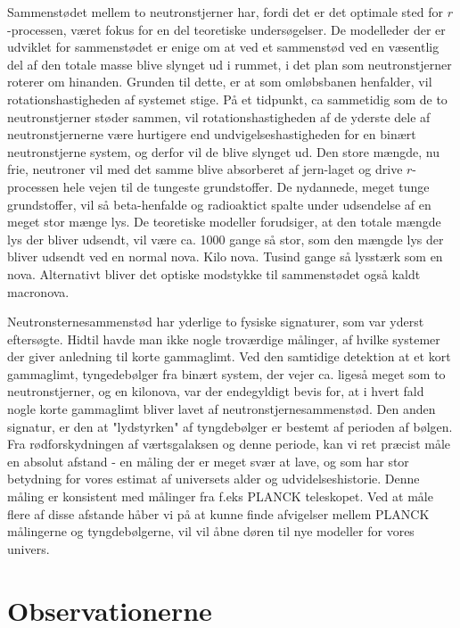 \documentclass[twocolumn]{article}
\begin{document}
Sammenstødet mellem to neutronstjerner har, fordi det er det optimale sted for $r$-processen, været fokus for en del teoretiske undersøgelser. De modelleder der er udviklet for sammenstødet er enige om at ved et sammenstød ved en væsentlig del af den totale masse blive slynget ud i rummet, i det plan som neutronstjerner roterer om hinanden. Grunden til dette, er at som omløbsbanen henfalder, vil rotationshastigheden af systemet stige. På et tidpunkt, ca sammetidig som de to neutronstjerner støder sammen, vil rotationshastigheden af de yderste dele af neutronstjernerne være hurtigere end undvigelseshastigheden for en binært neutronstjerne system, og derfor vil de blive slynget ud. Den store mængde, nu frie, neutroner vil med det samme blive absorberet af jern-laget og drive $r$-processen hele vejen til de tungeste grundstoffer. De nydannede, meget tunge grundstoffer, vil så beta-henfalde og radioaktict spalte under udsendelse af en meget stor mænge lys. De teoretiske modeller forudsiger, at den totale mængde lys der bliver udsendt, vil være ca. 1000 gange så stor, som den mængde lys der bliver udsendt ved en normal nova. Kilo nova. Tusind gange så lysstærk som en nova. Alternativt bliver det optiske modstykke til sammenstødet også kaldt macronova. 

Neutronsternesammenstød har yderlige to fysiske signaturer, som var yderst eftersøgte. Hidtil havde man ikke nogle troværdige målinger, af hvilke systemer der giver anledning til korte gammaglimt. Ved den samtidige detektion at et kort gammaglimt, tyngedebølger fra binært system, der vejer ca. ligeså meget som to neutronstjerner, og en kilonova, var der endegyldigt bevis for, at i hvert fald nogle korte gammaglimt bliver lavet af neutronstjernesammenstød. Den anden signatur, er den at "lydstyrken" af tyngdebølger er bestemt af perioden af bølgen. Fra rødforskydningen af værtsgalaksen og denne periode, kan vi ret præcist måle en absolut afstand - en måling der er meget svær at lave, og som har stor betydning for vores estimat af universets alder og udvidelseshistorie. Denne måling er konsistent med målinger fra f.eks PLANCK teleskopet. Ved at måle flere af disse afstande håber vi på at kunne finde afvigelser mellem PLANCK målingerne og tyngdebølgerne, vil vil åbne døren til nye modeller for vores univers. 


\section{Observationerne}\label{obs}
\end{document}
